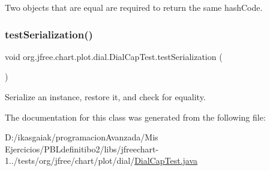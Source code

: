 Two objects that are equal are required to return the same hash\+Code. \mbox{\label{classorg_1_1jfree_1_1chart_1_1plot_1_1dial_1_1_dial_cap_test_a5f99a47f66a92442f54f12cf8ba18efc}} 
\subsubsection{\texorpdfstring{test\+Serialization()}{testSerialization()}}
{\footnotesize\ttfamily void org.\+jfree.\+chart.\+plot.\+dial.\+Dial\+Cap\+Test.\+test\+Serialization (\begin{DoxyParamCaption}{ }\end{DoxyParamCaption})}

Serialize an instance, restore it, and check for equality. 

The documentation for this class was generated from the following file\+:\begin{DoxyCompactItemize}
\item 
D\+:/ikasgaiak/programacion\+Avanzada/\+Mis Ejercicios/\+P\+B\+Ldefinitibo2/libs/jfreechart-\/1../tests/org/jfree/chart/plot/dial/\mbox{\hyperlink{_dial_cap_test_8java}{Dial\+Cap\+Test.\+java}}\end{DoxyCompactItemize}
